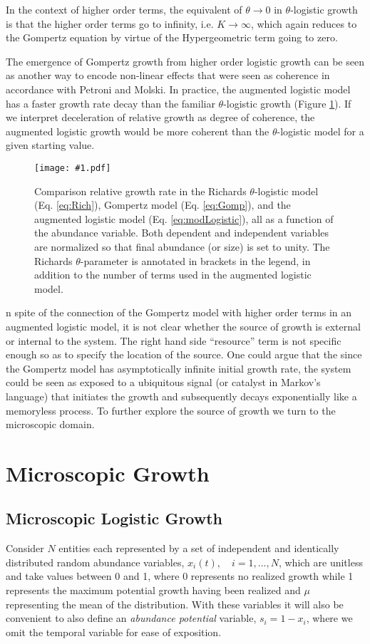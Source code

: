 \documentclass{article}
\newcommand{\insertPdfFig}[3]{
  \begin{figure}[H]
  \centering
  \texttt{[image: \#1.pdf]}
  \caption{#2}
  \label{fig:#1}
  \end{figure}
}
\begin{document}
 In the context of higher order terms, the equivalent of $\theta\rightarrow 0$ in $\theta$-logistic growth is that the higher order terms go to infinity, i.e. $K \rightarrow \infty$, which again reduces to the Gompertz equation by virtue of the Hypergeometric term going to zero. 

 The emergence of Gompertz growth from higher order logistic growth can be seen as another way to encode non-linear effects that were seen as coherence in accordance with Petroni and Molski. In practice, the augmented logistic model has a faster growth rate decay than the familiar $\theta$-logistic growth (Figure \ref{fig:hypergeometric_plain}). If we interpret deceleration of relative growth as degree of coherence, the augmented logistic growth would be more coherent than the $\theta$-logistic model for a given starting value. 

\insertPdfFig{hypergeometric_plain}{Comparison relative growth rate in the Richards $\theta$-logistic model (Eq. \ref{eq:Rich}), Gompertz model (Eq. \ref{eq:Gomp}), and the augmented logistic model (Eq. \ref{eq:modLogistic}), all as a function of the abundance variable. Both dependent and independent variables are normalized so that final abundance (or size) is set to unity. The Richards $\theta$-parameter is annotated in brackets in the legend, in addition to the number of terms used in the augmented logistic model.} 

In spite of the connection of the Gompertz model with higher order terms in an augmented logistic model, it is not clear whether the source of growth is external or internal to the system. The right hand side ``resource'' term is not specific enough so as to specify the location of the source. One could argue that the since the Gompertz model has asymptotically infinite initial growth rate, the system could be seen as exposed to a ubiquitous signal (or catalyst in Markov's language) that initiates the growth and subsequently decays exponentially like a memoryless process. To further explore the source of growth we turn to the microscopic domain.

\section{Microscopic Growth}
\label{sec:micro}

\subsection{Microscopic Logistic Growth}
Consider $N$ entities each represented by a set of independent and identically distributed random abundance variables, $x_i(t), \quad i=1, ..., N$, which are unitless and take values between 0 and 1, where 0 represents no realized growth while 1 represents the maximum potential growth having been realized and $\mu$ representing the mean of the distribution. With these variables it will also be convenient to also define an \textit{abundance potential} variable, $s_i = 1 - x_i$, where we omit the temporal variable for ease of exposition.
\end{document}
